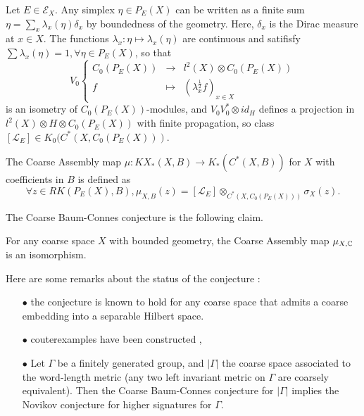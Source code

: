 Let $E\in \mathcal E_X$. Any simplex $\eta\in P_E(X)$ can be written as a finite sum $\eta=\sum_x \lambda_x(\eta)\delta_x$ by boundedness of the geometry. Here, $\delta_x$ is the Dirac measure at $x\in X$. The functions $\lambda_x :\eta\mapsto \lambda_x(\eta)$ are continuous and satifisfy $\sum\lambda_x(\eta) = 1,\forall\eta\in P_E(X)$, so that
\[V_0\left\{\begin{array}{rcl} 
 C_0(P_E(X)) & \rightarrow 	& l^2(X)\otimes C_0(P_E(X)) 		\\ 
 f           & \mapsto 		& (\lambda_x^{\frac{1}{2}}f)_{x\in X} 
\end{array}\right.\] 
is an isometry of $C_0(P_E(X))$-modules, and $V_0V_0^*\otimes id_H$ defines a projection in $l^2(X)\otimes H\otimes C_0(P_E(X))$ with finite propagation, so class $[\mathcal L_E]\in K_0(C^*(X,C_0(P_E(X)))$.\\

\begin{definition}
The Coarse Assembly map $\mu:KX_*(X,B)\rightarrow K_*(C^*(X,B))$ for $X$ with coefficients in $B$ is defined as 
\[\forall z\in RK(P_E(X), B), \mu_{X,B}(z)=[\mathcal L_E]\otimes_{C^*(X,C_0(P_E(X)))} \sigma_X(z).\]
\end{definition}

The Coarse Baum-Connes conjecture is the following claim.\\

\begin{conj}
For any coarse space $X$ with bounded geometry, the Coarse Assembly map $\mu_{X,\mathbb C}$ is an isomorphism.\\
\end{conj}

Here are some remarks about the status of the conjecture :
\begin{itemize}
\item[$\bullet$] the conjecture is known to hold for any coarse space that admits a coarse embedding into a  separable Hilbert space\cite{Yu2}.
\item[$\bullet$] couterexamples have been constructed \cite{HigsonLaffSk},
\item[$\bullet$] Let $\Gamma$ be a finitely generated group, and $|\Gamma|$ the coarse space associated to the word-length metric (any two left invariant metric on $\Gamma$ are coarsely equivalent). Then the Coarse Baum-Connes conjecture for $|\Gamma|$ implies the Novikov conjecture for higher signatures for $\Gamma$.
\end{itemize}

